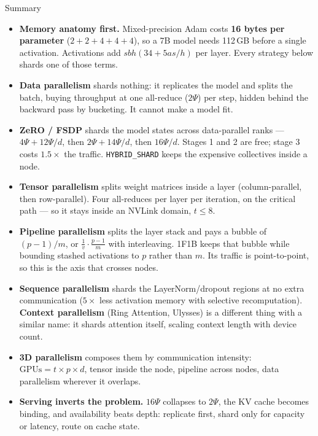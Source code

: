 \begin{frame}[allowframebreaks]{Summary}
  \begin{itemize}\footnotesize\itemsep0.25em
    \item[\textcolor{red}{$\blacktriangleright$}] \textbf{Memory anatomy first.} Mixed-precision Adam costs \textbf{16 bytes per parameter} ($2+2+4+4+4$), so a 7B model needs 112\,GB before a single activation. Activations add $sbh(34 + 5as/h)$ per layer. Every strategy below shards one of those terms.
    \item[\textcolor{red}{$\blacktriangleright$}] \textbf{Data parallelism} shards nothing: it replicates the model and splits the batch, buying throughput at one all-reduce ($2\Psi$) per step, hidden behind the backward pass by bucketing. It cannot make a model fit.
    \item[\textcolor{red}{$\blacktriangleright$}] \textbf{ZeRO / FSDP} shards the model states across data-parallel ranks --- $4\Psi + 12\Psi/d$, then $2\Psi + 14\Psi/d$, then $16\Psi/d$. Stages 1 and 2 are free; stage 3 costs $1.5\times$ the traffic. \texttt{HYBRID\_SHARD} keeps the expensive collectives inside a node.
    \item[\textcolor{red}{$\blacktriangleright$}] \textbf{Tensor parallelism} splits weight matrices inside a layer (column-parallel, then row-parallel). Four all-reduces per layer per iteration, on the critical path --- so it stays inside an NVLink domain, $t \leq 8$.
    \item[\textcolor{red}{$\blacktriangleright$}] \textbf{Pipeline parallelism} splits the layer stack and pays a bubble of $(p-1)/m$, or $\frac{1}{v}\cdot\frac{p-1}{m}$ with interleaving. 1F1B keeps that bubble while bounding stashed activations to $p$ rather than $m$. Its traffic is point-to-point, so this is the axis that crosses nodes.
    \item[\textcolor{red}{$\blacktriangleright$}] \textbf{Sequence parallelism} shards the LayerNorm/dropout regions at no extra communication ($5\times$ less activation memory with selective recomputation). \textbf{Context parallelism} (Ring Attention, Ulysses) is a different thing with a similar name: it shards attention itself, scaling context length with device count.
    \item[\textcolor{red}{$\blacktriangleright$}] \textbf{3D parallelism} composes them by communication intensity: $\text{GPUs} = t \times p \times d$, tensor inside the node, pipeline across nodes, data parallelism wherever it overlaps.
    \item[\textcolor{red}{$\blacktriangleright$}] \textbf{Serving inverts the problem.} $16\Psi$ collapses to $2\Psi$, the KV cache becomes binding, and availability beats depth: replicate first, shard only for capacity or latency, route on cache state.
  \end{itemize}
\end{frame}

